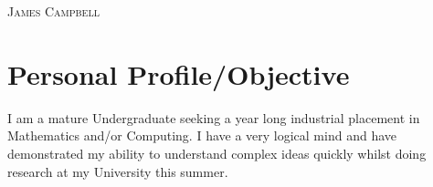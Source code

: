 \documentclass[a4paper, 11pt]{article}
\begin{document}
\pagestyle{empty} %
\begin{multicols}{2}

\raggedright{\textsc{\Huge{James Campbell}}}\\
\columnbreak
{}

\end{multicols}
\section{Personal Profile/Objective}
\begin{flushleft}
I am a mature Undergraduate seeking a year long industrial placement in Mathematics and/or Computing. I have a very logical mind and have demonstrated my ability to understand complex ideas quickly whilst doing research at my University this summer.
\end{flushleft}
\end{document}
